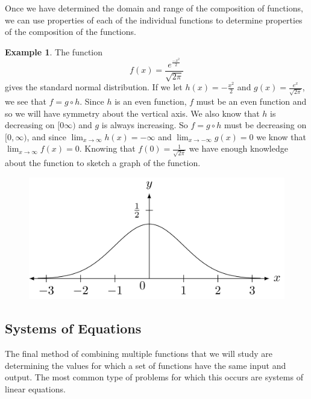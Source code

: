 \documentclass[
]{book}
\theoremstyle{definition}
\theoremstyle{definition}
\newtheorem{example}{Example}[chapter]
\theoremstyle{definition}
\theoremstyle{definition}
\theoremstyle{remark}
\begin{document}
Once we have determined the domain and range of the composition of functions, we can use properties of each of the individual functions to determine properties of the composition of the functions.

\begin{example}

The function
\[f(x) = \frac{e^{\frac{-x^2}{2}}}{\sqrt{2\pi}}\] gives the standard normal distribution. If we let \(h(x)=-\frac{x^2}{2}\) and \(g(x)=\frac{e^x}{\sqrt{2\pi}}\), we see that \(f=g\circ h\). Since \(h\) is an even function, \(f\) must be an even function and so we will have symmetry about the vertical axis. We also know that \(h\) is decreasing on \([0\infty)\) and \(g\) is always increasing. So \(f=g\circ h\) must be decreasing on \([0,\infty)\), and since \(\lim_{x\rightarrow \infty} h(x) = -\infty\) and \(\lim_{x\rightarrow -\infty} g(x) = 0\) we know that \(\lim_{x\rightarrow \infty} f(x) = 0\). Knowing that \(f(0)=\frac{1}{\sqrt{2\pi}}\) we have enough knowledge about the function to sketch a graph of the function.

\begin{figure}

{\centering \includegraphics[width=0.5\linewidth]{tikz/normal-distribution} 

}

\end{figure}

\end{example}

\hypertarget{systems-of-equations}{%
\subsection{Systems of Equations}\label{systems-of-equations}}

The final method of combining multiple functions that we will study are determining the values for which a set of functions have the same input and output. The most common type of problems for which this occurs are systems of linear equations.
\end{document}
